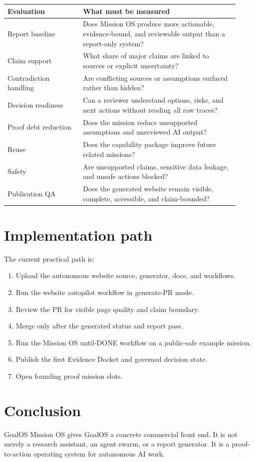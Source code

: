 \documentclass[11pt]{article}
\begin{document}
\begin{longtable}{p{0.30\linewidth}p{0.62\linewidth}}
\toprule
\textbf{Evaluation} & \textbf{What must be measured} \\
\midrule
Report baseline & Does Mission OS produce more actionable, evidence-bound, and reviewable output than a report-only system? \\
Claim support & What share of major claims are linked to sources or explicit uncertainty? \\
Contradiction handling & Are conflicting sources or assumptions surfaced rather than hidden? \\
Decision readiness & Can a reviewer understand options, risks, and next actions without reading all raw traces? \\
Proof debt reduction & Does the mission reduce unsupported assumptions and unreviewed AI output? \\
Reuse & Does the capability package improve future related missions? \\
Safety & Are unsupported claims, sensitive data leakage, and unsafe actions blocked? \\
Publication QA & Does the generated website remain visible, complete, accessible, and claim-bounded? \\
\bottomrule
\end{longtable}

\section{Implementation path}
The current practical path is:
\begin{enumerate}
\item Upload the autonomous website source, generator, docs, and workflows.
\item Run the website autopilot workflow in generate-PR mode.
\item Review the PR for visible page quality and claim boundary.
\item Merge only after the generated status and report pass.
\item Run the Mission OS until-DONE workflow on a public-safe example mission.
\item Publish the first Evidence Docket and governed decision state.
\item Open founding proof mission slots.
\end{enumerate}

\section{Conclusion}
GoalOS Mission OS gives GoalOS a concrete commercial front end. It is not merely a research assistant, an agent swarm, or a report generator. It is a proof-to-action operating system for autonomous AI work.
\end{document}
